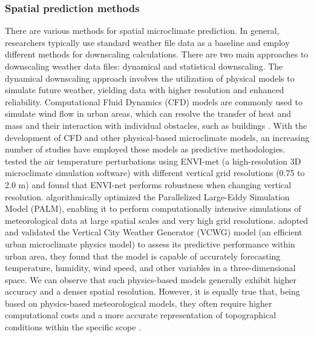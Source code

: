 \documentclass[a4paper,fleqn]{cas-sc}
\begin{document}
\subsubsection{Spatial prediction methods}

There are various methods for spatial microclimate prediction. In general, researchers typically use standard weather file data as a baseline and employ different methods for downscaling calculations. There are two main approaches to downscaling weather data files: dynamical and statistical downscaling. The dynamical downscaling approach involves the utilization of physical models to simulate future weather, yielding data with higher resolution and enhanced reliability. Computational Fluid Dynamics (CFD) models are commonly used to simulate wind flow in urban areas, which can resolve the transfer of heat and mass and their interaction with individual obstacles, such as buildings \citep{toparlar2017review}. With the development of CFD and other physical-based microclimate models, an increasing number of studies have employed these models as predictive methodologies. \cite{crank2018evaluating} tested the air temperature perturbations using ENVI-met (a high-resolution 3D microclimate simulation software) with different vertical grid resolutions (0.75 to 2.0 m) and found that ENVI-net performs robustness when changing vertical resolution. \cite{maronga2015parallelized} algorithmically optimized the Parallelized Large-Eddy Simulation Model (PALM), enabling it to perform computationally intensive simulations of meteorological data at large spatial scales and very high grid resolutions. \cite{moradi2021vertical} adopted and validated the Vertical City Weather Generator (VCWG) model (an efficient urban microclimate physics model) to assess its predictive performance within urban area, they found that the model is capable of accurately forecasting temperature, humidity, wind speed, and other variables in a three-dimensional space. We can observe that such physics-based models generally exhibit higher accuracy and a denser spatial resolution. However, it is equally true that, being based on physics-based meteorological models, they often require higher computational costs and a more accurate representation of topographical conditions within the specific scope \citep{p2021comparative}. 
\end{document}
